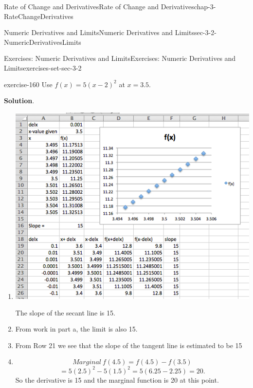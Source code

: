 \documentclass[oneside,10pt,]{book}
\numberwithin{equation}{section}
\begin{document}
\begin{chapterptx}{Rate of Change and Derivatives}{}{Rate of Change and Derivatives}{}{}{chap-3-RateChangeDerivatives}
\begin{sectionptx}{Numeric Derivatives and Limits}{}{Numeric Derivatives and Limits}{}{}{sec-3-2-NumericDerivativesLimits}
\begin{exercises-subsection-numberless}{Exercises: Numeric Derivatives and Limits}{}{Exercises: Numeric Derivatives and Limits}{}{}{exercises-set-sec-3-2}
\begin{exercisegroup}
\begin{divisionexerciseeg}{3}{}{}{exercise-160}%
\hypertarget{p-1073}{}%
Use \(f(x)=5(x-2)^2\) at \(x=3.5\).%
\par\smallskip%
\noindent\textbf{Solution}.\hypertarget{solution-79}{}\quad%
\leavevmode%
\begin{enumerate}[label=(\alph*)]
\item\hypertarget{li-325}{}\leavevmode%
\begin{sidebyside}{1}{0.05}{0.05}{0}%
\begin{sbspanel}{0.9}%
\includegraphics[width=1\linewidth]{images/sec3-2-sol3a.png}
\end{sbspanel}%
\end{sidebyside}%
\par
\hypertarget{p-1074}{}%
The slope of the secant line is 15.%
\item\hypertarget{li-326}{}\hypertarget{p-1075}{}%
From work in part a, the limit is also 15.%
\item\hypertarget{li-327}{}\hypertarget{p-1076}{}%
From Row 21 we see that the slope of the tangent line is estimated to be 15%
\item\hypertarget{li-328}{}\hypertarget{p-1077}{}%
%
\begin{equation*}
Marginal\ f(4.5)=f(4.5)-f(3.5)
\end{equation*}
%
\begin{equation*}
=5 (2.5)^2-5(1.5)^2=5(6.25-2.25)=20.
\end{equation*}
So the derivative is 15 and the marginal function is 20 at this point.%

\end{enumerate}
\end{divisionexerciseeg}
\end{exercisegroup}
\end{exercises-subsection-numberless}
\end{sectionptx}
\end{chapterptx}
\end{document}
